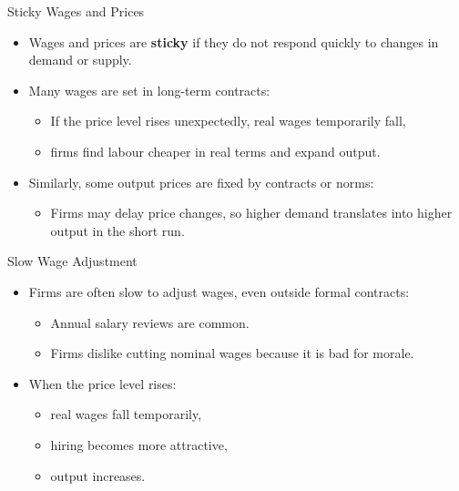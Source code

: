 \documentclass[aspectratio=169]{beamer}
\begin{document}
\begin{frame}{Sticky Wages and Prices}
\transfade
\begin{itemize}[<+->]
  \item Wages and prices are \textbf{sticky} if they do not respond quickly to changes in demand or supply.
  \item Many wages are set in long-term contracts:
  \begin{itemize}[<+->]
    \item If the price level rises unexpectedly, real wages temporarily fall,
    \item firms find labour cheaper in real terms and expand output.
  \end{itemize}
  \item Similarly, some output prices are fixed by contracts or norms:
  \begin{itemize}[<+->]
    \item Firms may delay price changes, so higher demand translates into higher output in the short run.
  \end{itemize}
\end{itemize}
\end{frame}

\begin{frame}{Slow Wage Adjustment}
\transfade
\begin{itemize}[<+->]
  \item Firms are often slow to adjust wages, even outside formal contracts:
  \begin{itemize}[<+->]
    \item Annual salary reviews are common.
    \item Firms dislike cutting nominal wages because it is bad for morale.
  \end{itemize}
  \item When the price level rises:
  \begin{itemize}[<+->]
    \item real wages fall temporarily,
    \item hiring becomes more attractive,
    \item output increases.
  \end{itemize}
\end{itemize}
\end{frame}
\end{document}
